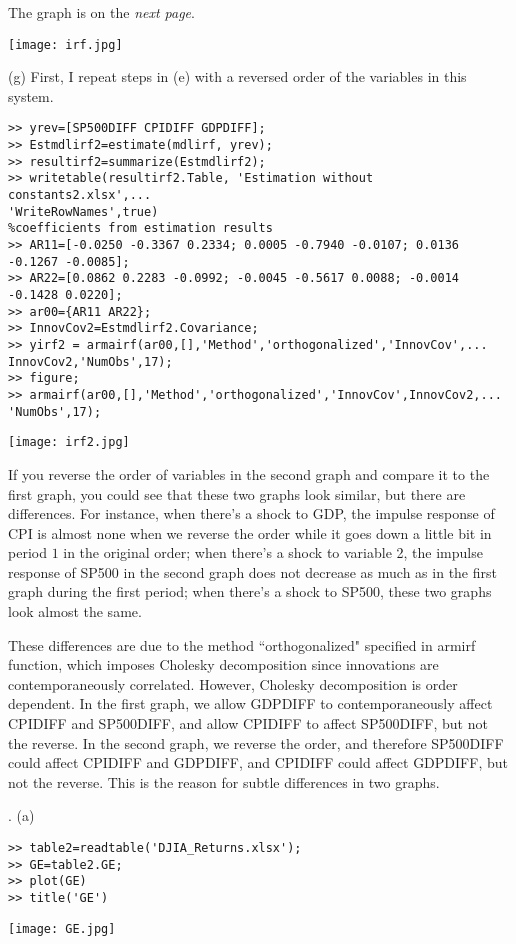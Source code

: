 \documentclass[11pt]{article}
\begin{document}
The graph is on the \textit{next page}.

\texttt{[image: irf.jpg]}

\bigskip
(g) First, I repeat steps in (e) with a reversed order of the variables in this system.
\begin{lstlisting}
>> yrev=[SP500DIFF CPIDIFF GDPDIFF];
>> Estmdlirf2=estimate(mdlirf, yrev);
>> resultirf2=summarize(Estmdlirf2);
>> writetable(resultirf2.Table, 'Estimation without constants2.xlsx',...
'WriteRowNames',true)
%coefficients from estimation results
>> AR11=[-0.0250 -0.3367 0.2334; 0.0005 -0.7940 -0.0107; 0.0136 -0.1267 -0.0085];
>> AR22=[0.0862 0.2283 -0.0992; -0.0045 -0.5617 0.0088; -0.0014 -0.1428 0.0220];
>> ar00={AR11 AR22};
>> InnovCov2=Estmdlirf2.Covariance;
>> yirf2 = armairf(ar00,[],'Method','orthogonalized','InnovCov',...
InnovCov2,'NumObs',17);
>> figure;
>> armairf(ar00,[],'Method','orthogonalized','InnovCov',InnovCov2,...
'NumObs',17);
\end{lstlisting}
\texttt{[image: irf2.jpg]}

If you reverse the order of variables in the second graph and compare it to the first graph, you could see that these two graphs look similar, but there are differences. For instance, when there's a shock to GDP, the impulse response of CPI is almost none when we reverse the order while it goes down a little bit in period $1$ in the original order; when there’s a shock to variable 2, the impulse response of SP500 in the second graph does not decrease as much as in the first graph during the first period; when there’s a shock to SP500, these two graphs look almost the same.

These differences are due to the method ``orthogonalized" specified in armirf function, which imposes Cholesky decomposition since innovations are contemporaneously correlated. However, Cholesky decomposition is order dependent. In the first graph, we allow GDPDIFF to contemporaneously affect CPIDIFF and SP500DIFF, and allow CPIDIFF to affect SP500DIFF, but not the reverse. In the second graph, we reverse the order, and therefore SP500DIFF could affect CPIDIFF and GDPDIFF, and CPIDIFF could affect GDPDIFF, but not the reverse. This is the reason for subtle differences in two graphs.

. (a) \begin{lstlisting}
>> table2=readtable('DJIA_Returns.xlsx');
>> GE=table2.GE;
>> plot(GE)
>> title('GE')
\end{lstlisting}
\texttt{[image: GE.jpg]}
\end{document}
